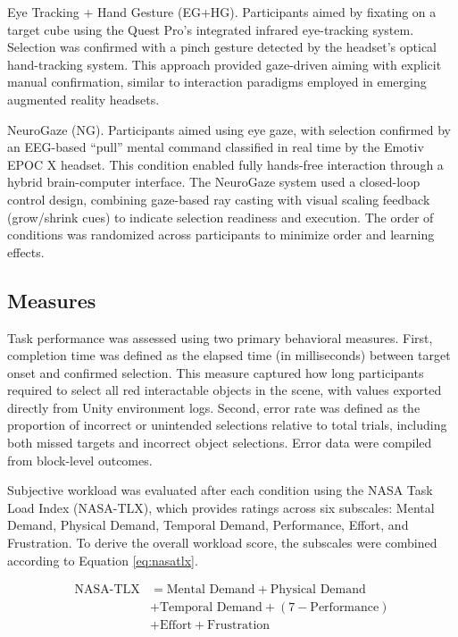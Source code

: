 \documentclass[utf8]{FrontiersinHarvard} %
\begin{document}
Eye Tracking + Hand Gesture (EG+HG). Participants aimed by fixating on a target cube using the Quest Pro's integrated infrared eye-tracking system. Selection was confirmed with a pinch gesture detected by the headset's optical hand-tracking system. This approach provided gaze-driven aiming with explicit manual confirmation, similar to interaction paradigms employed in emerging augmented reality headsets.

NeuroGaze (NG). Participants aimed using eye gaze, with selection confirmed by an EEG-based “pull” mental command classified in real time by the Emotiv EPOC X headset. This condition enabled fully hands-free interaction through a hybrid brain-computer interface. The NeuroGaze system used a closed-loop control design, combining gaze-based ray casting with visual scaling feedback (grow/shrink cues) to indicate selection readiness and execution.
The order of conditions was randomized across participants to minimize order and learning effects.

\subsection{Measures}
Task performance was assessed using two primary behavioral measures. First, completion time was defined as the elapsed time (in milliseconds) between target onset and confirmed selection. This measure captured how long participants required to select all red interactable objects in the scene, with values exported directly from Unity environment logs. Second, error rate was defined as the proportion of incorrect or unintended selections relative to total trials, including both missed targets and incorrect object selections. Error data were compiled from block-level outcomes.

Subjective workload was evaluated after each condition using the NASA Task Load Index (NASA-TLX), which provides ratings across six subscales: Mental Demand, Physical Demand, Temporal Demand, Performance, Effort, and Frustration.  To derive the overall workload score, the subscales were combined according to Equation \ref{eq:nasatlx}.

\begin{equation}
\begin{split}
\text{NASA-TLX} &= \text{Mental Demand} + \text{Physical Demand} \\
&+ \text{Temporal Demand} + (7 - \text{Performance}) \\
&+ \text{Effort} + \text{Frustration}
\end{split}
\label{eq:nasatlx}
\end{equation}
\end{document}
